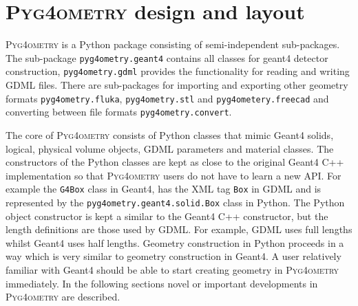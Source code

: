 \documentclass[final,5p,times,twocolumn]{elsarticle}
\newcommand{\pyinline}[1]{\lstinline[postbreak={}]{#1}}
\newcommand{\PYGEOMETRY}{\textsc{Pyg4ometry}}
\begin{document}
\section{\PYGEOMETRY{} design and layout}
\PYGEOMETRY{} is a Python package consisting of semi-independent sub-packages. The sub-package \pyinline{pyg4ometry.geant4} contains all classes for 
geant4 detector construction, \pyinline{pyg4ometry.gdml} provides the functionality for reading and writing GDML files. There are sub-packages for importing and 
exporting other geometry formats  \pyinline{pyg4ometry.fluka}, \pyinline{pyg4ometry.stl} and \pyinline{pyg4ometery.freecad} and converting between file formats 
\verb|pyg4ometry.convert|.

The core of \PYGEOMETRY{} consists of Python classes that mimic Geant4 solids, logical, physical volume objects, GDML parameters and material classes.
The constructors of the Python classes are kept as close to the original Geant4 C++ implementation so that \PYGEOMETRY{} users do not have to learn 
a new API. For example the \verb|G4Box| class in Geant4, has the XML tag \verb|Box| in GDML and is represented by the \pyinline{pyg4ometry.geant4.solid.Box} 
class in Python. The Python object constructor is kept a similar to the Geant4 C++ constructor, but the length definitions are those used by GDML. For example, 
GDML uses full lengths whilst Geant4 uses half lengths. Geometry construction in Python proceeds in a way which is very similar to geometry construction in Geant4. 
A user relatively familiar with Geant4 should be able to start creating geometry in \PYGEOMETRY{} immediately. In the following sections novel or important developments 
in \PYGEOMETRY{} are described.  
\end{document}
